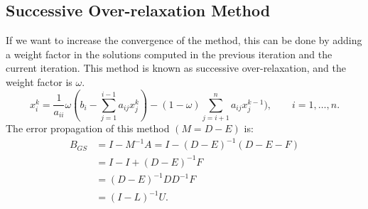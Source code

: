 \documentclass[a4paper,10pt]{report}
\begin{document}
\subsection{Successive Over-relaxation Method}
If we want to increase the convergence of the method, this can be done by adding a weight factor in the solutions computed in the previous iteration
and the current iteration. This method is known as successive over-relaxation, and the weight factor is $\omega$.
\begin{equation*}
x^k_i=\frac{1}{a_{ii}}\omega(b_i-\sum_{j=1}^{i-1}a_{ij}x_{j}^{k})-(1-\omega)\sum_{j=i+1}^{n}a_{ij}x_{j}^{k-1}), \qquad i=1,\dots,n.
\end{equation*}
The error propagation of this method $(M=D-E)$ is:
\begin{align*}
 B_{GS}&=I-M^{-1}A=I-(D-E)^{-1}(D-E-F)\\
 &=I-I+(D-E)^{-1}F\\
 &=(D-E)^{-1}DD^{-1}F\\
&=(I-L)^{-1}U.
\end{align*}
\end{document}
